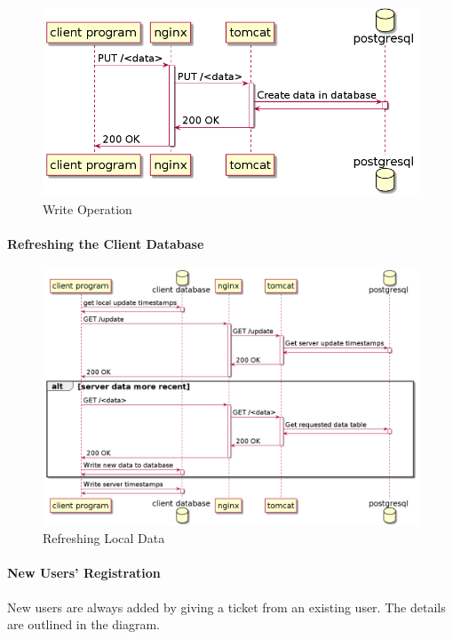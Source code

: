 \documentclass[a4paper]{memoir}
\begin{document}
\begin{figure}[!ht]
\includegraphics[width=\linewidth]{diagrams/put-data.png}
\caption{Write Operation}
\end{figure}

\paragraph{Refreshing the Client Database\\}

\begin{figure}[!ht]
\includegraphics[width=\linewidth]{diagrams/refresh-data.png}
\caption{Refreshing Local Data}
\end{figure}

\paragraph{New Users' Registration}

New users are always added by giving a ticket from an existing user. The details
are outlined in the diagram.
\end{document}
